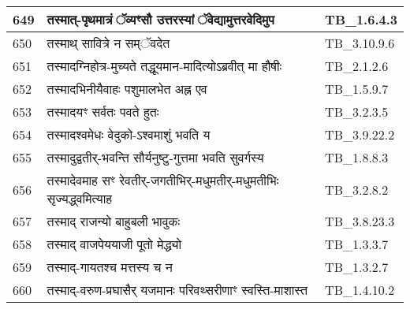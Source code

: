 \documentclass[17pt]{extarticle}
\begin{document}
\begin{longtable}{||p{0.4in}||p{4.9in}||p{0.9in}||}
    \hline
        
    649 & तस्मात्{-}पृथमात्रं ॅव्यꣳसौ उत्तरस्यां ॅवेद्यामुत्तरवेदिमुप & TB\_1.6.4.3       \\
    
    \hline
        
    650 & तस्माथ् सावित्रे न सम्ॅवदेत & TB\_3.10.9.6       \\
    
    \hline
        
    651 & तस्मादग्निहोत्र{-}मुच्यते तद्धूयमान{-}मादित्योऽब्रवीत् मा हौषीः & TB\_2.1.2.6       \\
    
    \hline
        
    652 & तस्मादभिनीयैवाहः पशुमालभेत अह्न एव & TB\_1.5.9.7       \\
    
    \hline
        
    653 & तस्मादयꣳ सर्वतः पवते हुतः & TB\_3.2.3.5       \\
    
    \hline
        
    654 & तस्मादश्वमेधः वेदुको{-}ऽश्वमाशुं भवति य & TB\_3.9.22.2       \\
    
    \hline
        
    655 & तस्मादुद्वतीर्{-}भवन्ति सौर्यनुष्टु{-}गुत्तमा भवति सुवर्गस्य & TB\_1.8.8.3       \\
    
    \hline
        
    656 & तस्मादेवमाह सꣳ रेवतीर्{-}जगतीभिर्{-}मधुमतीर्{-}मधुमतीभिः सृज्यद्ध्वमित्याह & TB\_3.2.8.2       \\
    
    \hline
        
    657 & तस्माद् राजन्यो बाहुबली भावुकः & TB\_3.8.23.3       \\
    
    \hline
        
    658 & तस्माद् वाजपेययाजी पूतो मेद्ध्यो & TB\_1.3.3.7       \\
    
    \hline
        
    659 & तस्माद्{-}गायतश्च मत्तस्य च न & TB\_1.3.2.7       \\
    
    \hline
        
    660 & तस्माद्{-}वरुण{-}प्रघासैर् यजमानः परिवथ्सरीणाꣳ स्वस्ति{-}माशास्त & TB\_1.4.10.2       \\
    

\end{longtable}
\end{document}
